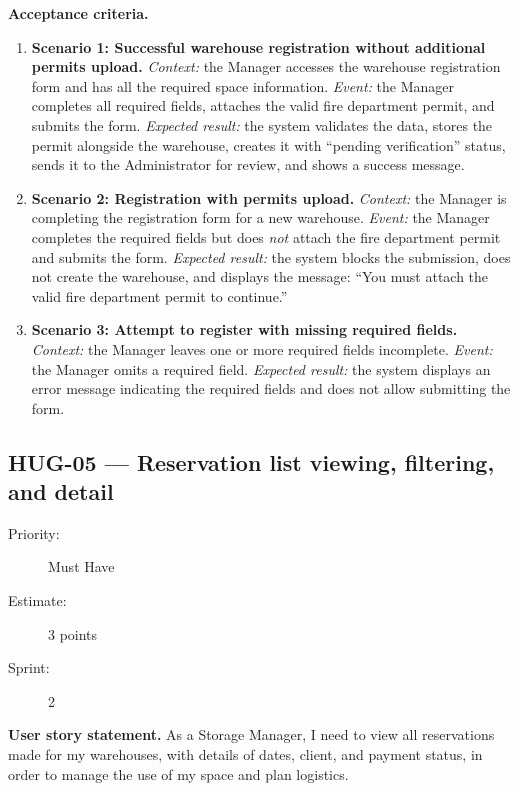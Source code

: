 \documentclass[11pt,a4paper,oneside]{report}
\begin{document}
\textbf{Acceptance criteria.}
\begin{enumerate}
\item \textbf{Scenario 1: Successful warehouse registration without additional permits upload.} \emph{Context:} the Manager accesses the warehouse registration form and has all the required space information. \emph{Event:} the Manager completes all required fields, attaches the valid fire department permit, and submits the form. \emph{Expected result:} the system validates the data, stores the permit alongside the warehouse, creates it with ``pending verification'' status, sends it to the Administrator for review, and shows a success message.
\item \textbf{Scenario 2: Registration with permits upload.} \emph{Context:} the Manager is completing the registration form for a new warehouse. \emph{Event:} the Manager completes the required fields but does \emph{not} attach the fire department permit and submits the form. \emph{Expected result:} the system blocks the submission, does not create the warehouse, and displays the message: ``You must attach the valid fire department permit to continue.''
\item \textbf{Scenario 3: Attempt to register with missing required fields.} \emph{Context:} the Manager leaves one or more required fields incomplete. \emph{Event:} the Manager omits a required field. \emph{Expected result:} the system displays an error message indicating the required fields and does not allow submitting the form.
\end{enumerate}

\subsection{HUG-05 --- Reservation list viewing, filtering, and detail}
\label{req:HUG-05}
\begin{description}
\item[Priority:] Must Have \quad \item[Estimate:] 3 points \quad \item[Sprint:] 2
\end{description}

\textbf{User story statement.} As a Storage Manager, I need to view all reservations made for my warehouses, with details of dates, client, and payment status, in order to manage the use of my space and plan logistics.
\end{document}
